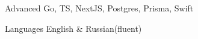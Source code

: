 
\begin{cvskills}

  \cvskill
    {Advanced}
    {Go, TS, NextJS, Postgres, Prisma, Swift}

  \cvskill
    {Languages}
    {English \& Russian(fluent)}

\end{cvskills}
